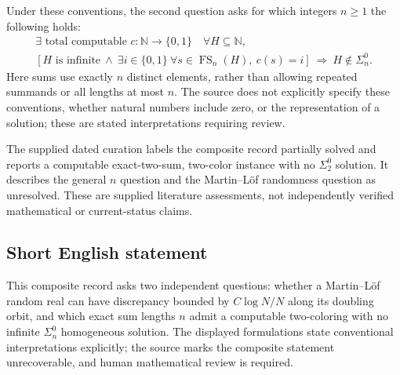 \documentclass[11pt]{article}
\newcommand{\N}{\mathbb{N}}
\begin{document}
\begin{enumerate}
Under these conventions, the second question asks for which integers \(n\geq1\) the following holds:
\[
\begin{gathered}
\exists\text{ total computable }c:\N\to\{0,1\}\quad
\forall H\subseteq\N,\\
\left[
H\text{ is infinite}\ \land\
\exists i\in\{0,1\}\ \forall s\in\operatorname{FS}_n(H),\ c(s)=i
\right]
\ \Longrightarrow\ H\notin\Sigma^0_n.
\end{gathered}
\]
Here sums use exactly \(n\) distinct elements, rather than allowing repeated summands or all lengths at most \(n\). The source does not explicitly specify these conventions, whether natural numbers include zero, or the representation of a solution; these are stated interpretations requiring review.
\end{enumerate}

The supplied dated curation labels the composite record partially solved and reports a computable exact-two-sum, two-color instance with no \(\Sigma^0_2\) solution. It describes the general \(n\) question and the Martin--L\"of randomness question as unresolved. These are supplied literature assessments, not independently verified mathematical or current-status claims.
\subsection{Short English statement}
This composite record asks two independent questions: whether a Martin--L\"of random real can have discrepancy bounded by \(C\log N/N\) along its doubling orbit, and which exact sum lengths \(n\) admit a computable two-coloring with no infinite \(\Sigma^0_n\) homogeneous solution. The displayed formulations state conventional interpretations explicitly; the source marks the composite statement unrecoverable, and human mathematical review is required.
\end{document}
